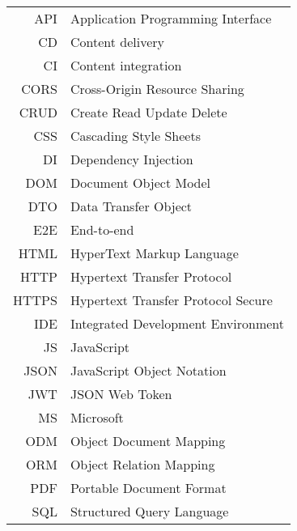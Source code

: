 \begin{longtable}{rl}
API & Application Programming Interface\\
CD & Content delivery\\
CI & Content integration\\
CORS & Cross-Origin Resource Sharing\\
CRUD & Create Read Update Delete\\
CSS & Cascading Style Sheets\\
DI & Dependency Injection\\
DOM & Document Object Model\\
DTO & Data Transfer Object\\
E2E & End-to-end\\
HTML & HyperText Markup Language\\
HTTP & Hypertext Transfer Protocol\\
HTTPS & Hypertext Transfer Protocol Secure\\
IDE & Integrated Development Environment\\
JS & JavaScript\\
JSON & JavaScript Object Notation\\
JWT & JSON Web Token\\
MS & Microsoft\\
ODM & Object Document Mapping\\
ORM & Object Relation Mapping\\
PDF & Portable Document Format\\
SQL & Structured Query Language\\

\end{longtable}
